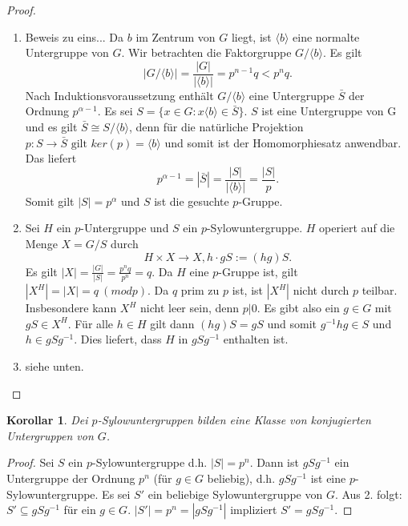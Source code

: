 \documentclass[12pt]{scrartcl}%
\newtheorem{kor}{Korollar}
\theoremstyle{definition}
\theoremstyle{remark}
\begin{document}
\begin{proof}
\begin{enumerate}

	\item Beweis zu eins...
\newpage
	Da $b$ im Zentrum von $G$ liegt, ist $\langle b \rangle$ eine normalte Untergruppe von $G$. Wir betrachten die Faktorgruppe $G/ \langle b \rangle$. Es gilt
	$$ |G/ \langle b \rangle | = \frac{|G|}{| \langle b \rangle |} = p^{n-1}q < p^nq. $$
	Nach Induktionsvoraussetzung enthält $G / \langle b \rangle$ eine Untergruppe $\bar{S}$ der Ordnung $p^{\alpha - 1}$. Es sei $S = \{ x \in G : x \langle b \rangle \in \bar{S} \}$. $S$ ist eine Untergruppe von G und es gilt $ \bar{S} \cong S/ \langle b \rangle$, denn für die natürliche Projektion $p: S \rightarrow \bar{S} \text{ gilt } ker(p) = \langle b \rangle$ und somit ist der Homomorphiesatz anwendbar. Das liefert
	$$ p^{\alpha - 1} = |\bar{S}| = \frac{|S|}{| \langle b \rangle |} = \frac{|S|}{p}. $$
	Somit gilt $|S| = p^{\alpha}$ und $S$ ist die gesuchte $p$-Gruppe.
	
	\item Sei $H$ ein $p$-Untergruppe und $S$ ein $p$-Sylowuntergruppe. $H$ operiert auf die Menge $X = G/S$ durch
	$$ H \times X \rightarrow X, h \cdot gS := (hg)S.$$
	Es gilt $|X| = \frac{|G|}{|S|} = \frac{p^nq}{p^n} = q$. Da $H$ eine $p$-Gruppe ist, gilt $|X^H| = |X| = q \ (modp)$. Da $q$ prim zu $p$ ist, ist $|X^H|$ nicht durch $p$ teilbar. Insbesondere kann $X^H$ nicht leer sein, denn $p|0$. Es gibt also ein $g \in G$ mit $gS \in X^H$. Für alle $h \in H$ gilt dann $(hg)S = gS$ und somit $g^{-1}hg \in S$ und $h \in gSg^{-1}$. Dies liefert, dass $H$ in $gSg^{-1}$ enthalten ist.
	
	\item siehe unten.
\end{enumerate}
\end{proof}

\begin{kor}
	Dei $p$-Sylowuntergruppen bilden eine Klasse von konjugierten Untergruppen von $G$.
\end{kor}

\begin{proof}
	Sei $S$ ein $p$-Sylowuntergruppe d.h. $|S| = p^n$. Dann ist $gSg^{-1}$ ein Untergruppe der Ordnung $p^n$ (für $g \in G$ beliebig), d.h. $gSg^{-1}$ ist eine $p$-Sylowuntergruppe. Es sei $S'$ ein beliebige Sylowuntergruppe von $G$. Aus 2. folgt: $S' \subseteq gSg^{-1}$ für ein $g \in G$. $|S'| = p^n = |gSg^{-1}|$ impliziert $S' = gSg^{-1}$.
\end{proof}
\end{document}
